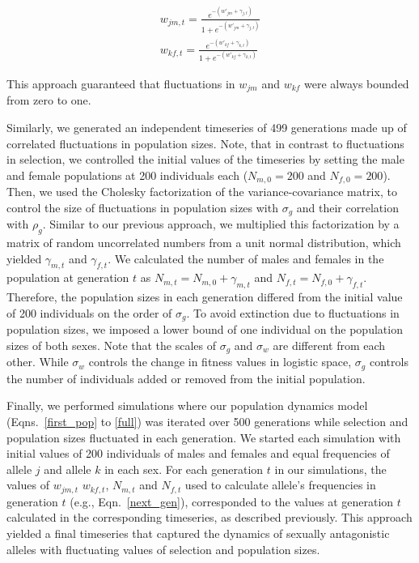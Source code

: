 \documentclass[12pt]{article}
\begin{document}
\begin{eqnarray}
  w_{jm,t}= \frac{e^{-(w'_{jm}+ \gamma_{j,t})}}{1+ e^{-(w'_{jm}+ \gamma_{j,t})}} \\
    w_{kf,t}= \frac{e^{-(w'_{kf}+ \gamma_{k,t})}}{1+ e^{-(w'_{kf}+ \gamma_{k,t})}}
    \label{logistic_w}
\end{eqnarray}

This approach guaranteed that fluctuations in $w_{jm}$ and $w_{kf}$ were always bounded from zero to one.

Similarly, we generated an independent timeseries of 499 generations made up of correlated fluctuations in population sizes. Note, that in contrast to fluctuations in selection, we controlled the initial values of the timeseries by setting the male and female populations at 200 individuals each ($N_{m,0} =200$ and $N_{f,0} =200$). Then, we used the Cholesky factorization of the variance-covariance matrix, to control the size of fluctuations in population sizes with $\sigma_{g}$ and their correlation with $\rho_{g}$. Similar to our previous approach, we multiplied this factorization by a matrix of random uncorrelated numbers from a unit normal distribution, which yielded $\gamma_{m,t}$ and $\gamma_{f,t}$. We calculated the number of males and females in the population at generation $t$ as $N_{m,t} = N_{m,0} + \gamma_{m,t}$ and $N_{f,t} = N_{f,0}+ \gamma_{f,t} $. Therefore, the population sizes in each generation differed from the initial value of 200 individuals on the order of $\sigma_{g}$. To avoid extinction due to fluctuations in population sizes, we imposed a lower bound of one individual on the population sizes of both sexes. Note that the scales of $\sigma_{g}$ and  $\sigma_{w}$ are different from each other. While $\sigma_{w}$ controls the change in fitness values in logistic space, $\sigma_{g}$ controls the number of individuals added or removed from the initial population.



Finally, we performed simulations where our population dynamics model (Eqns.~\ref{first_pop} to \ref{full}) was iterated over 500 generations while selection and population sizes fluctuated in each generation. We started each simulation with initial values of 200 individuals of males and females and equal frequencies of allele $j$ and allele $k$ in each sex. For each generation $t$ in our simulations, the values of $w_{jm,t}$ $w_{kf,t}$, $N_{m,t}$ and $N_{f,t}$ used to calculate allele's frequencies in generation $t$ (e.g., Eqn.~\ref{next_gen}), corresponded to the values at generation $t$ calculated in the corresponding timeseries, as described previously. This approach yielded a final timeseries that captured the dynamics of sexually antagonistic alleles with fluctuating values of selection and population sizes.
\end{document}
